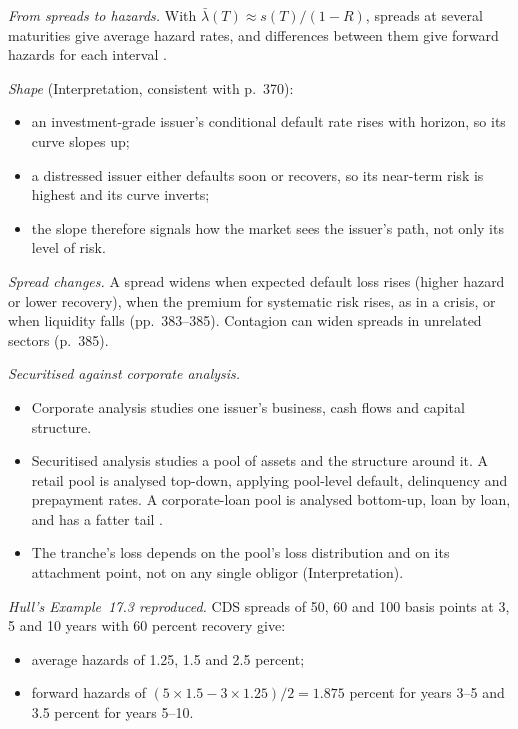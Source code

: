 \begin{qfmethod}\label{meth:credit-spread-term-structure}
 \emph{From spreads to hazards.} With $\bar\lambda(T)\approx s(T)/(1-R)$, spreads at several maturities give average hazard rates, and differences between them give forward hazards for each interval \citep[pp.~380--381]{risk-management-financial-institutions-2023}.

\emph{Shape} (Interpretation, consistent with p.~370):
\begin{itemize}
\item an investment-grade issuer's conditional default rate rises with horizon, so its curve slopes up;
\item a distressed issuer either defaults soon or recovers, so its near-term risk is highest and its curve inverts;
\item the slope therefore signals how the market sees the issuer's path, not only its level of risk.
\end{itemize}

\emph{Spread changes.} A spread widens when expected default loss rises (higher hazard or lower recovery), when the premium for systematic risk rises, as in a crisis, or when liquidity falls (pp.~383--385). Contagion can widen spreads in unrelated sectors (p.~385).

\emph{Securitised against corporate analysis.}
\begin{itemize}
\item Corporate analysis studies one issuer's business, cash flows and capital structure.
\item Securitised analysis studies a pool of assets and the structure around it. A retail pool is analysed top-down, applying pool-level default, delinquency and prepayment rates. A corporate-loan pool is analysed bottom-up, loan by loan, and has a fatter tail \citep[p.~218]{fabozzi-kothari-securitisation-2008}.
\item The tranche's loss depends on the pool's loss distribution and on its attachment point, not on any single obligor (Interpretation).
\end{itemize}

 \emph{Hull's Example~17.3 reproduced.} CDS spreads of 50, 60 and 100 basis points at 3, 5 and 10 years with 60 percent recovery give:
\begin{itemize}
\item average hazards of 1.25, 1.5 and 2.5 percent;
\item forward hazards of $(5\times1.5-3\times1.25)/2=1.875$ percent for years 3--5 and 3.5 percent for years 5--10.
\end{itemize}


\end{qfmethod}
